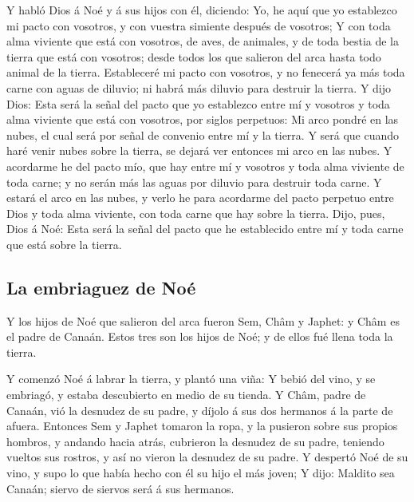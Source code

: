  Y habló Dios á Noé y á sus hijos con él, diciendo:
 Yo, he aquí que yo establezco mi pacto con vosotros, y
con vuestra simiente después de vosotros;  Y con toda
alma viviente que está con vosotros, de aves, de animales, y de toda
bestia de la tierra que está con vosotros; desde todos los que salieron
del arca hasta todo animal de la tierra.  Estableceré mi
pacto con vosotros, y no fenecerá ya más toda carne con aguas de
diluvio; ni habrá más diluvio para destruir la tierra.  Y
dijo Dios: Esta será la señal del pacto que yo establezco entre mí y
vosotros y toda alma viviente que está con vosotros, por siglos
perpetuos:  Mi arco pondré en las nubes, el cual será por
señal de convenio entre mí y la tierra.  Y será que
cuando haré venir nubes sobre la tierra, se dejará ver entonces mi arco
en las nubes.  Y acordarme he del pacto mío, que hay
entre mí y vosotros y toda alma viviente de toda carne; y no serán más
las aguas por diluvio para destruir toda carne.  Y estará
el arco en las nubes, y verlo he para acordarme del pacto perpetuo entre
Dios y toda alma viviente, con toda carne que hay sobre la tierra.
 Dijo, pues, Dios á Noé: Esta será la señal del pacto que
he establecido entre mí y toda carne que está sobre la tierra.

\hypertarget{la-embriaguez-de-nouxe9}{%
\subsection{La embriaguez de Noé}\label{la-embriaguez-de-nouxe9}}

 Y los hijos de Noé que salieron del arca fueron Sem,
Châm y Japhet: y Châm es el padre de Canaán.  Estos tres
son los hijos de Noé; y de ellos fué llena toda la tierra.

 Y comenzó Noé á labrar la tierra, y plantó una viña:
 Y bebió del vino, y se embriagó, y estaba descubierto en
medio de su tienda.  Y Châm, padre de Canaán, vió la
desnudez de su padre, y díjolo á sus dos hermanos á la parte de afuera.
 Entonces Sem y Japhet tomaron la ropa, y la pusieron
sobre sus propios hombros, y andando hacia atrás, cubrieron la desnudez
de su padre, teniendo vueltos sus rostros, y así no vieron la desnudez
de su padre.  Y despertó Noé de su vino, y supo lo que
había hecho con él su hijo el más joven;  Y dijo: Maldito
sea Canaán; siervo de siervos será á sus hermanos.

